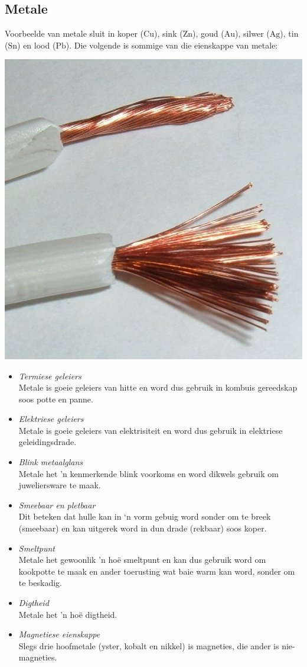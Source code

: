             \subsection*{Metale}
            \nopagebreak
\begin{minipage}{.5\textwidth}
        \label{m38708*id65726}Voorbeelde van metale sluit in koper ($\text{Cu}$), sink ($\text{Zn}$), goud ($\text{Au}$), silwer ($\text{Ag}$), tin ($\text{Sn}$) en lood ($\text{Pb}$). Die volgende is sommige van die eienskappe van metale:\par 
\end{minipage}
\begin{minipage}{.5\textwidth}
\begin{center}
 \includegraphics[width=.2\textwidth]{photos/copperwire.jpg}
\end{center}
\end{minipage}
\vspace{-.5cm}
        \label{m38708*id65732}\begin{itemize}[noitemsep]
            \label{m38708*uid77}\item \textsl{Termiese geleiers} \\
       Metale is goeie geleiers van hitte en word dus gebruik in kombuis gereedskap soos potte en panne.
\label{m38708*uid78}\item \textsl{Elektriese geleiers} \\
       Metale is goeie geleiers van elektrisiteit en word dus gebruik in elektriese geleidingsdrade.
\label{m38708*uid79}\item \textsl{Blink metaalglans} \\
       Metale het 'n kenmerkende blink voorkoms en word dikwels gebruik om juweliersware te maak.
\label{m38708*uid80}\item \textsl{Smeebaar en pletbaar} \\
       Dit beteken dat hulle kan in ‘n vorm gebuig word sonder om te breek (smeebaar) en kan uitgerek word in dun drade
      (rekbaar) soos koper.
\label{m38708*uid81}\item \textsl{Smeltpunt} \\
       Metale het gewoonlik 'n hoë smeltpunt en kan dus gebruik word om kookpotte te maak 
      en ander toerusting wat baie warm kan word, sonder om te beskadig.
\label{m38708*uid82}\item \textsl{Digtheid} \\
       Metale het 'n hoë digtheid.
\item \textsl{Magnetiese eienskappe} \\ 
       Slegs drie hoofmetale (yster, kobalt en nikkel) is magneties, die ander is nie-magneties.
\end{itemize}
